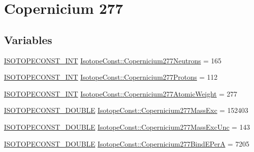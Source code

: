 \hypertarget{group___isotope_const-_copernicium-_cn277}{}\section{Copernicium 277}
\label{group___isotope_const-_copernicium-_cn277}
\subsection*{Variables}
\begin{DoxyCompactItemize}
\item 
\mbox{\hyperlink{group___isotope_const-_macros_ga5f18360b3e99483a35c32d789e62621c}{I\+S\+O\+T\+O\+P\+E\+C\+O\+N\+S\+T\+\_\+\+I\+NT}} \mbox{\hyperlink{group___isotope_const-_copernicium-_cn277_gad6408d4ceb0a6fcd46b7c554ab2ee71e}{Isotope\+Const\+::\+Copernicium277\+Neutrons}} = 165
\item 
\mbox{\hyperlink{group___isotope_const-_macros_ga5f18360b3e99483a35c32d789e62621c}{I\+S\+O\+T\+O\+P\+E\+C\+O\+N\+S\+T\+\_\+\+I\+NT}} \mbox{\hyperlink{group___isotope_const-_copernicium-_cn277_ga99aeba44f9b0acf188a84632854be5db}{Isotope\+Const\+::\+Copernicium277\+Protons}} = 112
\item 
\mbox{\hyperlink{group___isotope_const-_macros_ga5f18360b3e99483a35c32d789e62621c}{I\+S\+O\+T\+O\+P\+E\+C\+O\+N\+S\+T\+\_\+\+I\+NT}} \mbox{\hyperlink{group___isotope_const-_copernicium-_cn277_ga9f2bd85cc629fa5b0df122317099617f}{Isotope\+Const\+::\+Copernicium277\+Atomic\+Weight}} = 277
\item 
\mbox{\hyperlink{group___isotope_const-_macros_ga8f45a7272ce02c0b4c65c44636ed719a}{I\+S\+O\+T\+O\+P\+E\+C\+O\+N\+S\+T\+\_\+\+D\+O\+U\+B\+LE}} \mbox{\hyperlink{group___isotope_const-_copernicium-_cn277_ga09ff8c3bdb78ed6cf1a41d7ce33765f2}{Isotope\+Const\+::\+Copernicium277\+Mass\+Exc}} = 152403
\item 
\mbox{\hyperlink{group___isotope_const-_macros_ga8f45a7272ce02c0b4c65c44636ed719a}{I\+S\+O\+T\+O\+P\+E\+C\+O\+N\+S\+T\+\_\+\+D\+O\+U\+B\+LE}} \mbox{\hyperlink{group___isotope_const-_copernicium-_cn277_gaf58f58a8449fa6f025bcb6f738588bef}{Isotope\+Const\+::\+Copernicium277\+Mass\+Exc\+Unc}} = 143
\item 
\mbox{\hyperlink{group___isotope_const-_macros_ga8f45a7272ce02c0b4c65c44636ed719a}{I\+S\+O\+T\+O\+P\+E\+C\+O\+N\+S\+T\+\_\+\+D\+O\+U\+B\+LE}} \mbox{\hyperlink{group___isotope_const-_copernicium-_cn277_ga5478c055e1e3d308a69c7c0970278def}{Isotope\+Const\+::\+Copernicium277\+Bind\+E\+PerA}} = 7205

\end{DoxyCompactItemize}
